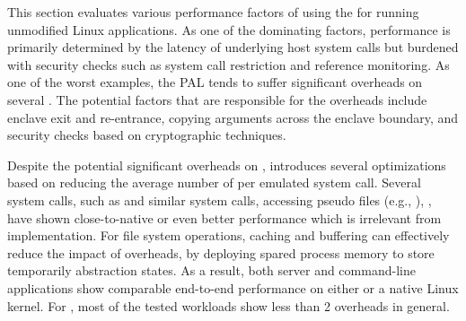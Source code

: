 \label{sec:eval:summary}

This section evaluates
various performance factors of using the \graphene{} \libos{} for running unmodified Linux applications.
As one of the dominating factors,
\thehostabi{} performance is primarily determined by the latency of underlying host system calls
but burdened with security checks such as system call restriction and reference monitoring.
As one of the worst examples,
the \sgx{} PAL tends to suffer significant overheads on several \hostapis{}.
The potential factors that are responsible for the overheads
include enclave exit and re-entrance,
copying \hostapi{} arguments across the enclave boundary,
and security checks based on cryptographic techniques.


Despite the potential significant overheads
on \thehostabi{},
\thelibos{} introduces several optimizations
based on reducing the average number of \hostapis{} per emulated system call.
Several system calls, such as  and similar system calls,
accessing pseudo files (e.g., ),
,
have shown close-to-native or even better performance
which is irrelevant from
\thehostabi{} implementation.
For file system operations,
caching and buffering can effectively reduce the impact of \hostapi{} overheads,
by deploying spared \picoproc{} process memory
to store temporarily abstraction states.
As a result, both server and command-line applications show comparable end-to-end performance
on either \graphene{} or a native Linux kernel.
For \graphenesgx{},
most of the tested workloads show less than 2\x{} overheads
in general.

